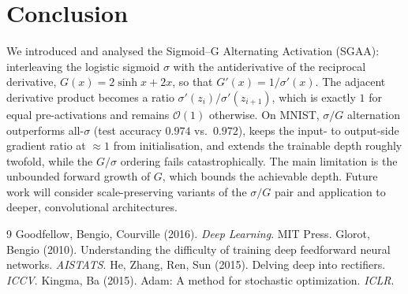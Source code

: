 \documentclass[11pt]{article}
\begin{document}
\section{Conclusion}
\label{sec:conclusion}
We introduced and analysed the Sigmoid--G Alternating Activation (SGAA):
interleaving the logistic sigmoid $\sigma$ with the antiderivative of the
reciprocal derivative, $G(x)=2\sinh x+2x$, so that $G'(x)=1/\sigma'(x)$.  The
adjacent derivative product becomes a ratio $\sigma'(z_i)/\sigma'(z_{i+1})$,
which is exactly $1$ for equal pre-activations and remains $\mathcal{O}(1)$
otherwise.  On MNIST, $\sigma/G$ alternation outperforms all-$\sigma$ (test
accuracy $0.974$ vs.\ $0.972$), keeps the input- to output-side gradient ratio
at $\approx1$ from initialisation, and extends the trainable depth roughly
twofold, while the $G/\sigma$ ordering fails catastrophically.  The main
limitation is the unbounded forward growth of $G$, which bounds the achievable
depth.  Future work will consider scale-preserving variants of the $\sigma/G$
pair and application to deeper, convolutional architectures.


\begin{thebibliography}{9}
 Goodfellow, Bengio, Courville (2016). \emph{Deep Learning}. MIT Press.
 Glorot, Bengio (2010). Understanding the difficulty of training deep feedforward neural networks. \emph{AISTATS}.
 He, Zhang, Ren, Sun (2015). Delving deep into rectifiers. \emph{ICCV}.
 Kingma, Ba (2015). Adam: A method for stochastic optimization. \emph{ICLR}.
\end{thebibliography}
\end{document}
